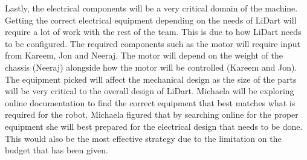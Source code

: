 \documentclass[12pt]{article}
\begin{document}
Lastly, the electrical components will be a very critical domain of the machine. Getting the correct electrical equipment depending on the needs of LiDart will require a lot of work with the rest of the team. This is due to how LiDart needs to be configured. The required components such as the motor will require input from Kareem, Jon and Neeraj. The motor will depend on the weight of the chassis (Neeraj) alongside how the motor will be controlled (Kareem and Jon).
The equipment picked will affect the mechanical design as the size of the parts will be very critical to the overall design of LiDart. Michaela will be exploring online documentation to find the correct equipment that best matches what is required for the robot. Michaela figured that by searching online for the proper equipment she will best prepared for the electrical design that needs to be done. This would also be the most effective strategy due to the limitation on the budget that has been given.
\end{document}
